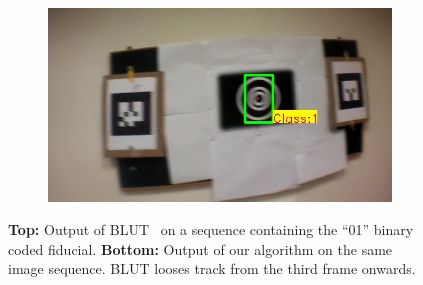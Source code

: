 \documentclass[10pt,twocolumn,letterpaper]{article}
\begin{document}
\begin{figure}
\begin{subfigure}[b]{.19\textwidth}
\end{subfigure}
\begin{subfigure}[b]{.19\textwidth}
\includegraphics[width=\linewidth]{images/BLUT_input_01/output15.jpg}
\end{subfigure}
\caption{{\bf Top:} Output of BLUT~\cite{Wu:2011} on a sequence containing
the ``01'' binary coded fiducial. {\bf Bottom:} Output of our
algorithm on the same image 
sequence. BLUT looses  track from the third frame onwards.}
\label{fig:BLUT_compare_01}
\end{figure}
\end{document}

